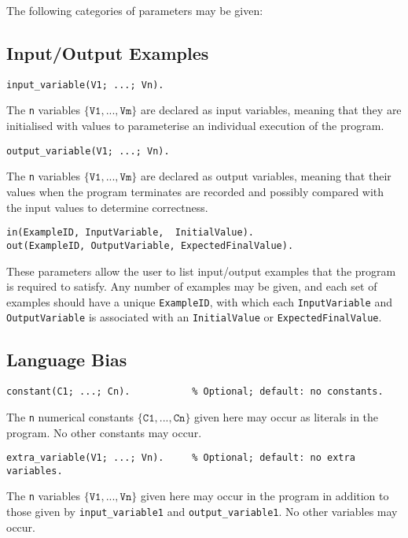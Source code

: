 \documentclass[a4paper,twoside,notitlepage]{report}
\newcommand{\ttt}{\texttt}
\begin{document}
The following categories of parameters may be given:

\subsection{Input/Output Examples}

\begin{Verbatim}[samepage=true]
input_variable(V1; ...; Vn).
\end{Verbatim}
The \ttt{n} variables $\{\ttt{V1}, ..., \ttt{Vm}\}$ are declared as input 
variables, meaning that they are initialised with values to parameterise an 
individual execution of the program.

\begin{Verbatim}[samepage=true]
output_variable(V1; ...; Vn).
\end{Verbatim}
The \ttt{n} variables $\{\ttt{V1}, ..., \ttt{Vm}\}$ are declared as output
variables, meaning that their values when the program terminates are recorded
and possibly compared with the input values to determine correctness.

\begin{Verbatim}[samepage=true]
 in(ExampleID, InputVariable,  InitialValue).
out(ExampleID, OutputVariable, ExpectedFinalValue).
\end{Verbatim}
These parameters allow the user to list input/output examples that the program 
is required to satisfy. Any number of examples may be given, and each set of 
examples should have a unique \ttt{ExampleID}, with which each 
\ttt{InputVariable} and \ttt{OutputVariable} is associated with an 
\ttt{InitialValue} or \ttt{ExpectedFinalValue}.

\subsection{Language Bias}
\begin{Verbatim}[samepage=true]
constant(C1; ...; Cn).           % Optional; default: no constants.
\end{Verbatim}
The \ttt{n} numerical constants $\{\ttt{C1}, ..., \ttt{Cn}\}$ 
given here may occur as literals in the program. No other constants may occur.

\begin{Verbatim}[samepage=true]
extra_variable(V1; ...; Vn).     % Optional; default: no extra variables.
\end{Verbatim}
The \texttt{n} variables $\{\ttt{V1}, ..., \ttt{Vn}\}$ given here 
may occur in the program in addition to those given by \ttt{input\_variable\/1}
and \ttt{output\_variable\/1}. No other variables may occur.
\end{document}
